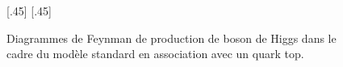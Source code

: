 \begin{figure}[p]
\vspace{2\baselineskip}

\subcaptionbox{\label{subfig-fgraph-Higgs_with_t_qq_g_tth}}[.45\textwidth]
{\vspace{\baselineskip}}
\hfill
\subcaptionbox{\label{subfig-fgraph-Higgs_with_t_gg_htt}}[.45\textwidth]
{\vspace{\baselineskip}}
\caption[Production de boson de Higgs en association avec un quark top.]{Diagrammes de Feynman de production de boson de Higgs dans le cadre du modèle standard en association avec un quark top.}
\label{fig-fgraph-Higgs_prod_with_t}
\end{figure}
